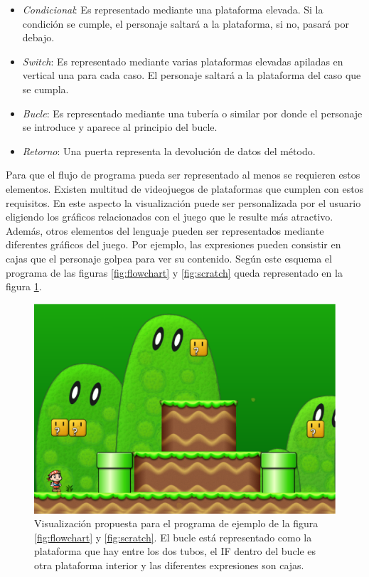 \documentclass{llncs}
\begin{document}
\begin{itemize}
\item {\em Condicional}: Es representado mediante una plataforma elevada. Si la condición se cumple, el personaje saltará a la plataforma, si no, pasará por debajo.
\item {\em Switch}: Es representado mediante varias plataformas elevadas apiladas en vertical una para cada caso. El personaje saltará a la plataforma del caso que se cumpla.
\item {\em Bucle}: Es representado mediante una tubería o similar por donde el personaje se introduce y aparece al principio del bucle.
\item {\em Retorno}: Una puerta representa la devolución de datos del método.
\end{itemize}

Para que el flujo de programa pueda ser representado al menos se requieren estos elementos. Existen multitud de videojuegos de plataformas que cumplen con estos requisitos. En este aspecto la visualización puede ser personalizada por el usuario eligiendo los gráficos relacionados con el juego que le resulte más atractivo. Además, otros elementos del lenguaje pueden ser representados mediante diferentes gráficos del juego. Por ejemplo, las expresiones pueden consistir en cajas que el personaje golpea para ver su contenido. Según este esquema el programa de las figuras \ref{fig:flowchart} y \ref{fig:scratch} queda representado en la figura \ref{fig:flowchartgame}.

\begin{figure}[ht]
\begin{center}
\includegraphics[scale=0.15]{images/flowchartgame.eps}
\caption{Visualización propuesta para el programa de ejemplo de la figura \ref{fig:flowchart} y \ref{fig:scratch}. El bucle está representado como la plataforma que hay entre los dos tubos, el IF dentro del bucle es otra plataforma interior y las diferentes expresiones son cajas.
\label{fig:flowchartgame}}
\end{center}
\end{figure}
\end{document}
